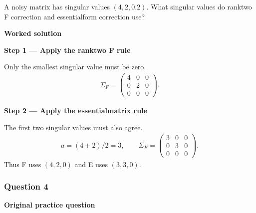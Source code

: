 \documentclass[letterpaper,11pt,english,openany,oneside]{jupyterBook}
\begin{document}
\sphinxAtStartPar
A noisy matrix has singular values \((4,2,0.2)\). What singular values do rank\sphinxhyphen{}two F correction and essential\sphinxhyphen{}form correction use?

\par\medskip

\par\medskip
\textbf{Worked solution}\par\smallskip

\par\medskip{}
{\color{QuizStepRed}\bfseries Step 1 — Apply the rank\sphinxhyphen{}two F rule}\par\smallskip

\sphinxAtStartPar
{} Only the smallest singular value must be zero.
{\color{QuizMathBlue} \begin{equation*}
\begin{split}
\Sigma_F=\begin{pmatrix}4&0&0\\0&2&0\\0&0&0\end{pmatrix}.
\end{split}
\end{equation*}}
\par

\par\medskip{}
{\color{QuizStepRed}\bfseries Step 2 — Apply the essential\sphinxhyphen{}matrix rule}\par\smallskip

\sphinxAtStartPar
{} The first two singular values must also agree.
{\color{QuizMathBlue} \begin{equation*}
\begin{split}
a=(4+2)/2=3,\qquad\Sigma_E=\begin{pmatrix}3&0&0\\0&3&0\\0&0&0\end{pmatrix}.
\end{split}
\end{equation*}}
\sphinxAtStartPar
Thus F uses {\color{QuizMathBlue} \((4,2,0)\)} and E uses {\color{QuizMathBlue} \((3,3,0)\)}.

\par

\par\medskip


\subsubsection{Question 4}
\label{\detokenize{lectures/lecture04/tldr:question-4}}\label{\detokenize{lectures/lecture04/tldr:lec04-tldr-q4}}
\par\medskip\textbf{Original practice question}\par\smallskip
\end{document}
